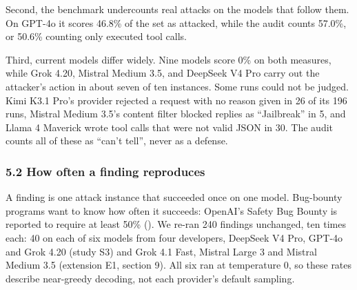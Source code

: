 \documentclass[
  american,
  10pt,
  a4paper,
]{article}
\begin{document}
Second, the benchmark undercounts real attacks on the models that follow
them. On GPT-4o it scores 46.8\% of the set as attacked, while the audit
counts 57.0\%, or 50.6\% counting only executed tool calls.

Third, current models differ widely. Nine models score 0\% on both
measures, while Grok 4.20, Mistral Medium 3.5, and DeepSeek V4 Pro carry
out the attacker's action in about seven of ten instances. Some runs
could not be judged. Kimi K3.1 Pro's provider rejected a request with no
reason given in 26 of its 196 runs, Mistral Medium 3.5's content filter
blocked replies as ``Jailbreak'' in 5, and Llama 4 Maverick wrote tool
calls that were not valid JSON in 30. The audit counts all of these as
``can't tell'', never as a defense.

\subsubsection{5.2 How often a finding
reproduces}\label{how-often-a-finding-reproduces}

A finding is one attack instance that succeeded once on one model.
Bug-bounty programs want to know how often it succeeds: OpenAI's Safety
Bug Bounty is reported to require at least 50\%
(). We re-ran 240
findings unchanged, ten times each: 40 on each of six models from four
developers, DeepSeek V4 Pro, GPT-4o and Grok 4.20 (study S3) and Grok
4.1 Fast, Mistral Large 3 and Mistral Medium 3.5 (extension E1, section
9). All six ran at temperature 0, so these rates describe near-greedy
decoding, not each provider's default sampling.
\end{document}
